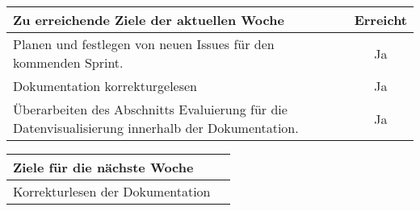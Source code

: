 \begin{tabularx}{\textwidth}{Xc}
    \arrayrulecolor{OliveGreen}
    \toprule
    {\bfseries Zu erreichende Ziele der aktuellen Woche} & {\bfseries Erreicht} \\
    \midrule[2pt]
    Planen und festlegen von neuen Issues für den kommenden Sprint.  &Ja      \\
    \rowcolor{OliveGreen!15}
    Dokumentation korrekturgelesen                          &Ja              \\
    \rowcolor{White}
    Überarbeiten des Abschnitts Evaluierung für die Datenvisualisierung
    innerhalb der Dokumentation.                  &Ja              \\
    \bottomrule[2pt]
\end{tabularx}
%
\vspace{1cm}
%
\begin{tabularx}{\textwidth}{Xc}
    \arrayrulecolor{OliveGreen}
    \toprule
    {\bfseries Ziele für die nächste Woche}        &                         \\
    \midrule[2pt]
    Korrekturlesen der Dokumentation               &                         \\
\end{tabularx}
